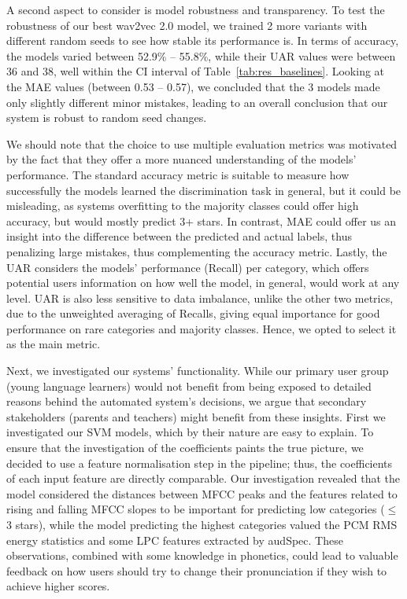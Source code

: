 \documentclass{article}
\begin{document}
A second aspect to consider is model robustness and transparency. To test the robustness of our best wav2vec 2.0 model, we trained 2 more variants with different random seeds to see how stable its performance is. In terms of accuracy, the models varied between 52.9\% -- 55.8\%, while their UAR values were between 36 and 38, well within the CI interval of Table~\ref{tab:res_baselines}. Looking at the MAE values (between 0.53 -- 0.57), we concluded that the 3 models made only slightly different minor mistakes, leading to an overall conclusion that our system is robust to random seed changes. 

We should note that the choice to use multiple evaluation metrics was motivated by the fact that they offer a more nuanced understanding of the models' performance. The standard accuracy metric is suitable to measure how successfully the models learned the discrimination task in general, but it could be misleading, as systems overfitting to the majority classes could offer high accuracy, but would mostly predict 3+ stars. In contrast, MAE could offer us an insight into the difference between the predicted and actual labels, thus penalizing large mistakes, thus complementing the accuracy metric. Lastly, the UAR considers the models' performance (Recall) per category, which offers potential users information on how well the model, in general, would work at any level. UAR is also less sensitive to data imbalance, unlike the other two metrics, due to the unweighted averaging of Recalls, giving equal importance for good performance on rare categories and majority classes. Hence, we opted to select it as the main metric.

Next, we investigated our systems' functionality. While our primary user group (young language learners) would not benefit from being exposed to detailed reasons behind the automated system's decisions, we argue that secondary stakeholders (parents and teachers) might benefit from these insights. First we investigated our SVM models, which by their nature are easy to explain. To ensure that the investigation of the coefficients paints the true picture, we decided to use a feature normalisation step in the pipeline; thus, the coefficients of each input feature are directly comparable. Our investigation revealed that the model considered the distances between MFCC peaks and the features related to rising and falling MFCC slopes to be important for predicting low categories ($\leq$ 3 stars), while the model predicting the highest categories valued the PCM RMS energy statistics and some LPC features extracted by audSpec. These observations, combined with some knowledge in phonetics, could lead to valuable feedback on how users should try to change their pronunciation if they wish to achieve higher scores.
\end{document}
